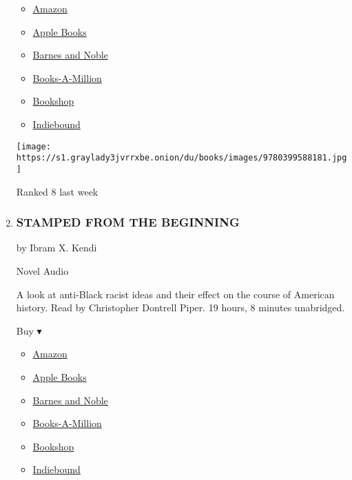 \begin{enumerate}
  \begin{itemize}
  \tightlist
  \item
    \href{https://www.amazon.com/Born-Crime-Stories-African-Childhood-ebook/dp/B01DHWACVY?tag=NYTBS-20}{Amazon}
  \item
    \href{https://du-gae-books-dot-nyt-du-prd.appspot.com/buy?title=BORN+A+CRIME\&author=Trevor+Noah}{Apple
    Books}
  \item
    \href{https://www.anrdoezrs.net/click-7990613-11819508?url=https\%3A\%2F\%2Fwww.barnesandnoble.com\%2Fw\%2F\%3Fean\%3D9781603932158}{Barnes
    and Noble}
  \item
    \href{https://www.anrdoezrs.net/click-7990613-35140?url=https\%3A\%2F\%2Fwww.booksamillion.com\%2Fp\%2FBORN\%2BA\%2BCRIME\%2FTrevor\%2BNoah\%2F9781603932158}{Books-A-Million}
  \item
    \href{https://bookshop.org/a/3546/9781603932158}{Bookshop}
  \item
    \href{https://www.indiebound.org/book/9781603932158?aff=NYT}{Indiebound}
  \end{itemize}

  \texttt{[image: https://s1.graylady3jvrrxbe.onion/du/books/images/9780399588181.jpg]}

  Ranked 8 last week
\item
  \hypertarget{stamped-from-the-beginning}{%
  \subsubsection{STAMPED FROM THE
  BEGINNING}\label{stamped-from-the-beginning}}

  by Ibram X. Kendi

  Novel Audio

  A look at anti-Black racist ideas and their effect on the course of
  American history. Read by Christopher Dontrell Piper. 19 hours, 8
  minutes unabridged.

  Buy ▾

  \begin{itemize}
  \tightlist
  \item
    \href{https://www.amazon.com/Stamped-Beginning-Definitive-History-National/dp/1568584636?tag=NYTBS-20}{Amazon}
  \item
    \href{https://du-gae-books-dot-nyt-du-prd.appspot.com/buy?title=STAMPED+FROM+THE+BEGINNING\&author=Ibram+X+Kendi}{Apple
    Books}
  \item
    \href{https://www.anrdoezrs.net/click-7990613-11819508?url=https\%3A\%2F\%2Fwww.barnesandnoble.com\%2Fs\%2FSTAMPED+FROM+THE+BEGINNING+Ibram+X+Kendi}{Barnes
    and Noble}
  \item
    \href{https://www.anrdoezrs.net/click-7990613-35140?url=https\%3A\%2F\%2Fwww.booksamillion.com\%2Fsearch\%3Fquery\%3DSTAMPED\%2BFROM\%2BTHE\%2BBEGINNING\%2BIbram\%2BX\%2BKendi}{Books-A-Million}
  \item
    \href{https://bookshop.org/books?keywords=STAMPED+FROM+THE+BEGINNING}{Bookshop}
  \item
    \href{https://www.indiebound.org/search/book?searchfor=STAMPED+FROM+THE+BEGINNING+Ibram+X+Kendi\&aff=NYT}{Indiebound}
  \end{itemize}


\end{enumerate}
